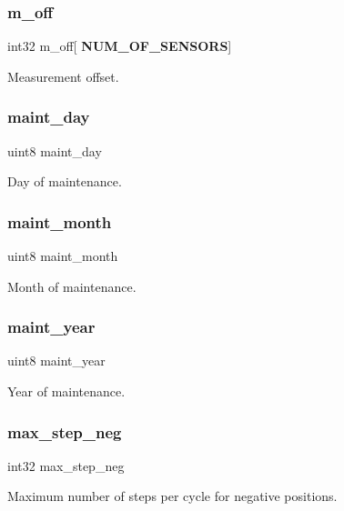 \subsubsection{m\+\_\+off}
{\footnotesize\ttfamily int32 m\+\_\+off[\textbf{ N\+U\+M\+\_\+\+O\+F\+\_\+\+S\+E\+N\+S\+O\+RS}]}

Measurement offset. \mbox{\label{structst__mem_ac2ef182894cf0000bdd2b54a8cee6017}} 
\subsubsection{maint\+\_\+day}
{\footnotesize\ttfamily uint8 maint\+\_\+day}

Day of maintenance. \mbox{\label{structst__mem_aaa5d3780f760d6ac17c1046b8477fdcb}} 
\subsubsection{maint\+\_\+month}
{\footnotesize\ttfamily uint8 maint\+\_\+month}

Month of maintenance. \mbox{\label{structst__mem_a1f57bd5d8df292f5a0e4f2d4f6df0beb}} 
\subsubsection{maint\+\_\+year}
{\footnotesize\ttfamily uint8 maint\+\_\+year}

Year of maintenance. \mbox{\label{structst__mem_a14fe3ed96d232dced2d33efc493a0667}} 
\subsubsection{max\+\_\+step\+\_\+neg}
{\footnotesize\ttfamily int32 max\+\_\+step\+\_\+neg}

Maximum number of steps per cycle for negative positions. \mbox{\label{structst__mem_a9be5987152b8c6bb28c1d311bc94e5e3}} 
